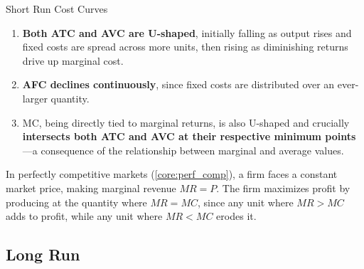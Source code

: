 \documentclass[10pt]{article}
\begin{document}
\begin{core}{Short Run Cost Curves}
      \begin{enumerate}

        \item \textbf{Both ATC and AVC are U-shaped}, initially falling as output rises and fixed costs are spread across more units, then rising as diminishing returns drive up marginal cost.

        \item \textbf{AFC declines continuously}, since fixed costs are distributed over an ever-larger quantity.

        \item MC, being directly tied to marginal returns, is also U-shaped and crucially \textbf{intersects both ATC and AVC at their respective minimum points}---a consequence of the relationship between marginal and average values.

      \end{enumerate}


      In perfectly competitive markets (\autoref{core:perf_comp}), a firm faces a constant market price, making marginal revenue $MR = P$. The firm maximizes profit by producing at the quantity where $MR = MC$, since any unit where $MR > MC$ adds to profit, while any unit where $MR < MC$ erodes it.


    \end{core}

  \subsection{Long Run}
\end{document}
